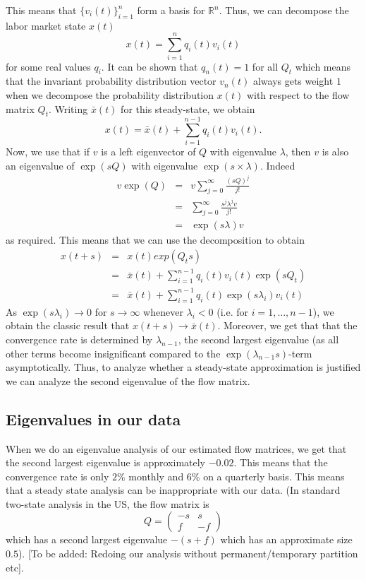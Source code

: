 This means that $\{v_i(t)\}_{i=1}^n$ form a basis for $\mathbb{R}^n$. Thus, we can decompose the labor market state $x(t)$
\[
x(t)=\sum_{i=1}^n q_i(t)v_i(t)
\]
for some real values $q_i$. It can be shown that $q_n(t)=1$ for all $Q_t$ which means that the invariant probability distribution vector $v_n(t)$ always gets weight $1$ when we decompose the probability distribution $x(t)$ with respect to the flow matrix $Q_t$. Writing $\bar{x}(t)$ for this steady-state, we obtain
\[
x(t)=\bar{x}(t)+\sum_{i=1}^{n-1}q_i(t)v_i(t).
\]
Now, we use that if $v$ is a left eigenvector of $Q$ with eigenvalue $\lambda$, then $v$ is also an eigenvalue of $\exp(sQ)$ with eigenvalue $\exp(s\times\lambda)$. Indeed
\begin{eqnarray*}
v\exp(Q)&=&v\sum_{j=0}^\infty \frac{(sQ)^j}{j!}\\
&=&\sum_{j=0}^\infty \frac{s^j \lambda^j v}{j!}\\
&=&\exp(s\lambda)v
\end{eqnarray*}
as required. This means that we can use the decomposition to obtain
\begin{eqnarray*}
x(t+s)&=&x(t)exp(Q_t s)\\
&=&\bar{x}(t)+\sum_{i=1}^{n-1}q_i(t)v_i(t)\exp(sQ_t)\\
&=&\bar{x}(t)+\sum_{i=1}^{n-1}q_i(t)\exp(s\lambda_i)v_i(t)
\end{eqnarray*}
As $\exp(s\lambda_i)\to 0$ for $s\to\infty$ whenever $\lambda_i<0$ (i.e. for $i=1,\dots,n-1$), we obtain the classic result that $x(t+s)\to \bar{x}(t)$. Moreover, we get that that the convergence rate is determined by $\lambda_{n-1}$, the second largest eigenvalue (as all other terms become insignificant compared to the $\exp(\lambda_{n-1}s)$-term asymptotically. Thus, to analyze whether a steady-state approximation is justified we can analyze the second eigenvalue of the flow matrix.

\subsection{Eigenvalues in our data}
When we do an eigenvalue analysis of our estimated flow matrices, we get that the second largest eigenvalue is approximately $-0.02$. This means that the convergence rate is only $2\%$ monthly and $6\%$ on a quarterly basis. This means that a steady state analysis can be inappropriate with our data. (In standard two-state analysis in the US, the flow matrix is 
\[
Q=\left(\begin{array}{cc}
	  -s & s \\
	  f & -f\end{array}\right)
\]
which has a second largest eigenvalue $-(s+f)$ which has an approximate size $0.5$). [To be added: Redoing our analysis without permanent/temporary partition etc].

